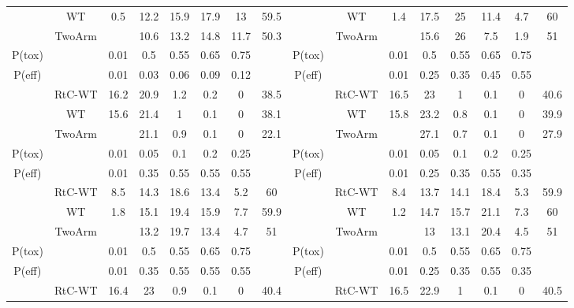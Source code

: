 \begin{table}
{\begin{tabular}[t]{ccccccc>{}c|cccccccc}
			& WT & 0.5 & 12.2 & 15.9 & 17.9 & 13 & 59.5 &  & WT & 1.4 & 17.5 & 25 & 11.4 & 4.7 & 60\\
			
			\multirow{-3}{*}{\centering\arraybackslash 3} & TwoArm &  & 10.6 & 13.2 & 14.8 & 11.7 & 50.3 & \multirow{-3}{*}{\centering\arraybackslash 9} & TwoArm &  & 15.6 & 26 & 7.5 & 1.9 & 51\\
			\cmidrule{1-16}
			P(tox) &  & 0.01 & 0.5 & 0.55 & 0.65 & 0.75 &  & P(tox) &  & 0.01 & 0.5 & 0.55 & 0.65 & 0.75 \vphantom{1} & \\
			\cmidrule{1-16}
			P(eff) &  & 0.01 & 0.03 & 0.06 & 0.09 & 0.12 &  & P(eff) &  & 0.01 & 0.25 & 0.35 & 0.45 & 0.55 & \\
			\cmidrule{1-16}
			& RtC-WT & 16.2 & 20.9 & 1.2 & 0.2 & 0 & 38.5 &  & RtC-WT & 16.5 & 23 & 1 & 0.1 & 0 & 40.6\\
			
			& WT & 15.6 & 21.4 & 1 & 0.1 & 0 & 38.1 &  & WT & 15.8 & 23.2 & 0.8 & 0.1 & 0 & 39.9\\
			
			\multirow{-3}{*}{\centering\arraybackslash 4} & TwoArm &  & 21.1 & 0.9 & 0.1 & 0 & 22.1 & \multirow{-3}{*}{\centering\arraybackslash 10} & TwoArm &  & 27.1 & 0.7 & 0.1 & 0 & 27.9\\
			\cmidrule{1-16}
			P(tox) &  & 0.01 & 0.05 & 0.1 & 0.2 & 0.25 &  & P(tox) &  & 0.01 & 0.05 & 0.1 & 0.2 & 0.25 & \\
			\cmidrule{1-16}
			P(eff) &  & 0.01 & 0.35 & 0.55 & 0.55 & 0.55 &  & P(eff) &  & 0.01 & 0.25 & 0.35 & 0.55 & 0.35 \vphantom{1} & \\
			\cmidrule{1-16}
			& RtC-WT & 8.5 & 14.3 & 18.6 & 13.4 & 5.2 & 60 &  & RtC-WT & 8.4 & 13.7 & 14.1 & 18.4 & 5.3 & 59.9\\
			
			& WT & 1.8 & 15.1 & 19.4 & 15.9 & 7.7 & 59.9 &  & WT & 1.2 & 14.7 & 15.7 & 21.1 & 7.3 & 60\\
			
			\multirow{-3}{*}{\centering\arraybackslash 5} & TwoArm &  & 13.2 & 19.7 & 13.4 & 4.7 & 51 & \multirow{-3}{*}{\centering\arraybackslash 11} & TwoArm &  & 13 & 13.1 & 20.4 & 4.5 & 51\\
			\cmidrule{1-16}
			P(tox) &  & 0.01 & 0.5 & 0.55 & 0.65 & 0.75 &  & P(tox) &  & 0.01 & 0.5 & 0.55 & 0.65 & 0.75 & \\
			\cmidrule{1-16}
			P(eff) &  & 0.01 & 0.35 & 0.55 & 0.55 & 0.55 &  & P(eff) &  & 0.01 & 0.25 & 0.35 & 0.55 & 0.35 & \\
			\cmidrule{1-16}
			& RtC-WT & 16.4 & 23 & 0.9 & 0.1 & 0 & 40.4 &  & RtC-WT & 16.5 & 22.9 & 1 & 0.1 & 0 & 40.5\\
			

\end{tabular}}
\end{table}
